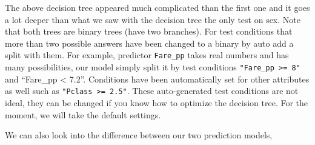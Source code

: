 \documentclass[
]{book}
\newenvironment{Shaded}{\begin{snugshade}}{\end{snugshade}}
\newcommand{\CommentTok}[1]{\textcolor[rgb]{0.56,0.35,0.01}{\textit{#1}}}
\newcommand{\DataTypeTok}[1]{\textcolor[rgb]{0.13,0.29,0.53}{#1}}
\newcommand{\DecValTok}[1]{\textcolor[rgb]{0.00,0.00,0.81}{#1}}
\newcommand{\KeywordTok}[1]{\textcolor[rgb]{0.13,0.29,0.53}{\textbf{#1}}}
\newcommand{\NormalTok}[1]{#1}
\newcommand{\OperatorTok}[1]{\textcolor[rgb]{0.81,0.36,0.00}{\textbf{#1}}}
\newcommand{\OtherTok}[1]{\textcolor[rgb]{0.56,0.35,0.01}{#1}}
\newcommand{\StringTok}[1]{\textcolor[rgb]{0.31,0.60,0.02}{#1}}
\begin{document}
The above decision tree appeared much complicated than the first one and it goes a lot deeper than what we saw with the decision tree the only test on sex. Note that both trees are binary trees (have two branches). For test conditions that more than two possible answers have been changed to a binary by auto add a split with them. For example, predictor \texttt{Fare\_pp} takes real numbers and has many possibilities, our model simply split it by test conditions \texttt{"Fare\_pp\ \textgreater{}=\ 8"} and ``Fare\_pp \textless{} 7.2''. Conditions have been automatically set for other attributes as well such as \texttt{"Pclass\ \textgreater{}=\ 2.5"}. These auto-generated test conditions are not ideal, they can be changed if you know how to optimize the decision tree. For the moment, we will take the default settings.

We can also look into the difference between our two prediction models,

\begin{Shaded}
\end{Shaded}
\end{document}
